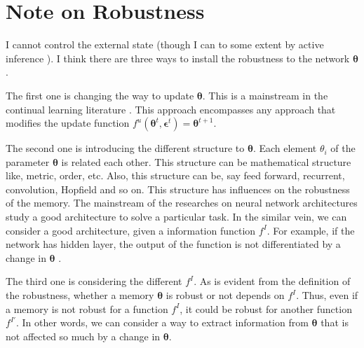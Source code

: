 \documentclass[12pt]{article}
\begin{document}
 \section{Note on Robustness}
 I cannot control the external state (though I can to some extent by active inference \cite{Friston10}). 
 I think there are three ways to install the robustness to the network $\bm{\theta}$. 
 
 The first one is changing the way to update $\bm{\theta}$. This is a mainstream in the continual learning literature \cite{Kirkpatrick17,Shin17}. 
 This approach encompasses any approach that modifies the update function $f^u(\bm{\theta}^t, \bm{\epsilon}^t) = \bm{\theta}^{t + 1}$.

 The second one is introducing the different structure to $\bm{\theta}$. Each element $\theta_i$ of the parameter $\bm{\theta}$ is related each other. 
 This structure can  be mathematical structure like, metric, order, etc. Also, this structure can be, say 
 feed forward, recurrent, convolution, Hopfield and so on. This structure has influences on the robustness of 
 the memory. The mainstream of the researches on neural network architectures study a good architecture to solve 
 a particular task. In the similar vein, we can consider a good architecture, given a information function $f^I$. 
 For example, if the network has hidden layer, the output of the function is not differentiated by a change in $\bm{\theta}$ \cite{Watanabe09,Amari06}.

 The third one is considering the different $f^I$. As is evident from the definition of the robustness, whether a memory $\bm{\theta}$ 
 is robust or not depends on $f^I$. Thus, even if a memory is not robust for a function $f^I$, it could be robust for another 
 function $f^{I'}$. In other words, we can consider a way to extract information from $\bm{\theta}$ that is not affected so much by 
 a change in $\bm{\theta}$.







\end{document}
